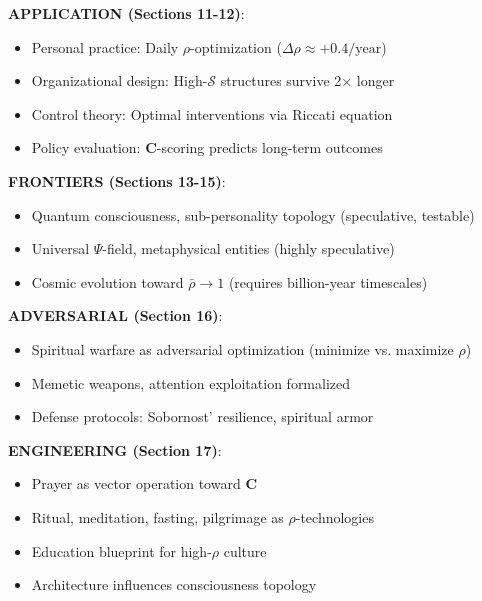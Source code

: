 \documentclass[11pt,a4paper]{article}
\theoremstyle{definition}
\theoremstyle{remark}
\begin{document}
\begin{enumerate}
\begin{protocol}
\begin{mdframed}[backgroundcolor=blue!5,linewidth=2pt]
\textbf{APPLICATION (Sections 11-12)}:
\begin{itemize}[nosep]
    \item Personal practice: Daily \(\rho\)-optimization (\(\Delta\rho \approx +0.4/\text{year}\))
    \item Organizational design: High-\(\mathcal{S}\) structures survive 2× longer
    \item Control theory: Optimal interventions via Riccati equation
    \item Policy evaluation: \(\mathbf{C}\)-scoring predicts long-term outcomes
\end{itemize}

\textbf{FRONTIERS (Sections 13-15)}:
\begin{itemize}[nosep]
    \item Quantum consciousness, sub-personality topology (speculative, testable)
    \item Universal \(\Psi\)-field, metaphysical entities (highly speculative)
    \item Cosmic evolution toward \(\bar{\rho} \to 1\) (requires billion-year timescales)
\end{itemize}

\textbf{ADVERSARIAL (Section 16)}:
\begin{itemize}[nosep]
    \item Spiritual warfare as adversarial optimization (minimize vs. maximize \(\rho\))
    \item Memetic weapons, attention exploitation formalized
    \item Defense protocols: Sobornost' resilience, spiritual armor
\end{itemize}

\textbf{ENGINEERING (Section 17)}:
\begin{itemize}[nosep]
    \item Prayer as vector operation toward \(\mathbf{C}\)
    \item Ritual, meditation, fasting, pilgrimage as \(\rho\)-technologies
    \item Education blueprint for high-\(\rho\) culture
    \item Architecture influences consciousness topology
\end{itemize}
\end{mdframed}

\begin{figure}[H]
\centering
{}
\end{figure}
\end{protocol}
\end{enumerate}
\end{document}
